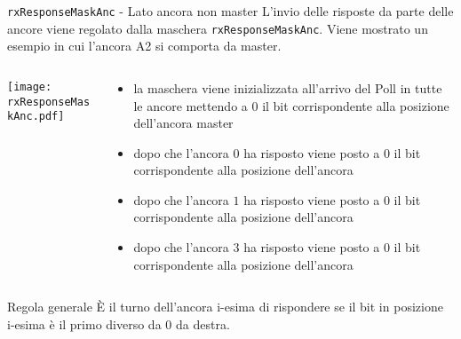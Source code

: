 \begin{frame}[shrink=10]{\lstinline!rxResponseMaskAnc! - Lato ancora \alert{non} master}
  L'invio delle risposte da parte delle ancore viene regolato dalla maschera \lstinline!rxResponseMaskAnc!.
  Viene mostrato un esempio in cui l'ancora A2 si comporta da master.
  \begin{columns}
    \begin{column}{0.4\textwidth}
      \begin{center}
        \texttt{[image: rxResponseMaskAnc.pdf]}
      \end{center}
    \end{column}
    \begin{column}{0.7\textwidth}
      \begin{itemize}
      \item[1)] la maschera viene inizializzata all'arrivo del Poll in tutte le ancore mettendo a $0$ il bit corrispondente alla posizione dell'ancora master
      \item[2)] dopo che l'ancora $0$ ha risposto viene posto a $0$ il bit corrispondente alla posizione dell'ancora 
      \item[3)] dopo che l'ancora $1$ ha risposto viene posto a $0$ il bit corrispondente alla posizione dell'ancora 
      \item[4)] dopo che l'ancora $3$ ha risposto viene posto a $0$ il bit corrispondente alla posizione dell'ancora 
      \end{itemize}
    \end{column}
  \end{columns}
  \begin{exampleblock}{Regola generale}
    È il turno dell'ancora i-esima di rispondere se il bit in posizione i-esima è il primo diverso da $0$ da destra.
  \end{exampleblock}
\end{frame}

